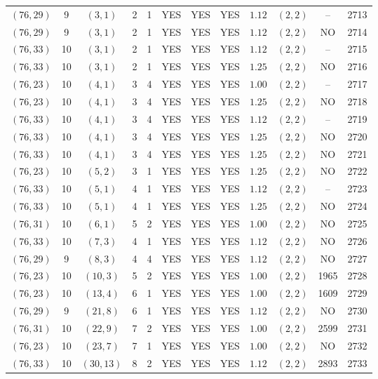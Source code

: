 \begin{longtable}{|c|c|c|c|c|c|c|c|c|c|c|c|}
$(76,29)$ & 9 & $(3,1)$ & 2 & 1 & YES & YES & YES & $1.12$ & $(2,2)$ & -- & 2713\\
$(76,29)$ & 9 & $(3,1)$ & 2 & 1 & YES & YES & YES & $1.12$ & $(2,2)$ & NO & 2714\\
$(76,33)$ & 10 & $(3,1)$ & 2 & 1 & YES & YES & YES & $1.12$ & $(2,2)$ & -- & 2715\\
$(76,33)$ & 10 & $(3,1)$ & 2 & 1 & YES & YES & YES & $1.25$ & $(2,2)$ & NO & 2716\\
$(76,23)$ & 10 & $(4,1)$ & 3 & 4 & YES & YES & YES & $1.00$ & $(2,2)$ & -- & 2717\\
$(76,23)$ & 10 & $(4,1)$ & 3 & 4 & YES & YES & YES & $1.25$ & $(2,2)$ & NO & 2718\\
$(76,33)$ & 10 & $(4,1)$ & 3 & 4 & YES & YES & YES & $1.12$ & $(2,2)$ & -- & 2719\\
$(76,33)$ & 10 & $(4,1)$ & 3 & 4 & YES & YES & YES & $1.25$ & $(2,2)$ & NO & 2720\\
$(76,33)$ & 10 & $(4,1)$ & 3 & 4 & YES & YES & YES & $1.25$ & $(2,2)$ & NO & 2721\\
$(76,23)$ & 10 & $(5,2)$ & 3 & 1 & YES & YES & YES & $1.25$ & $(2,2)$ & NO & 2722\\
$(76,33)$ & 10 & $(5,1)$ & 4 & 1 & YES & YES & YES & $1.12$ & $(2,2)$ & -- & 2723\\
$(76,33)$ & 10 & $(5,1)$ & 4 & 1 & YES & YES & YES & $1.25$ & $(2,2)$ & NO & 2724\\
$(76,31)$ & 10 & $(6,1)$ & 5 & 2 & YES & YES & YES & $1.00$ & $(2,2)$ & NO & 2725\\
$(76,33)$ & 10 & $(7,3)$ & 4 & 1 & YES & YES & YES & $1.12$ & $(2,2)$ & NO & 2726\\
$(76,29)$ & 9 & $(8,3)$ & 4 & 4 & YES & YES & YES & $1.12$ & $(2,2)$ & NO & 2727\\
$(76,23)$ & 10 & $(10,3)$ & 5 & 2 & YES & YES & YES & $1.00$ & $(2,2)$ & 1965 & 2728\\
$(76,23)$ & 10 & $(13,4)$ & 6 & 1 & YES & YES & YES & $1.00$ & $(2,2)$ & 1609 & 2729\\
$(76,29)$ & 9 & $(21,8)$ & 6 & 1 & YES & YES & YES & $1.12$ & $(2,2)$ & NO & 2730\\
$(76,31)$ & 10 & $(22,9)$ & 7 & 2 & YES & YES & YES & $1.00$ & $(2,2)$ & 2599 & 2731\\
$(76,23)$ & 10 & $(23,7)$ & 7 & 1 & YES & YES & YES & $1.00$ & $(2,2)$ & NO & 2732\\
$(76,33)$ & 10 & $(30,13)$ & 8 & 2 & YES & YES & YES & $1.12$ & $(2,2)$ & 2893 & 2733\\

\end{longtable}
